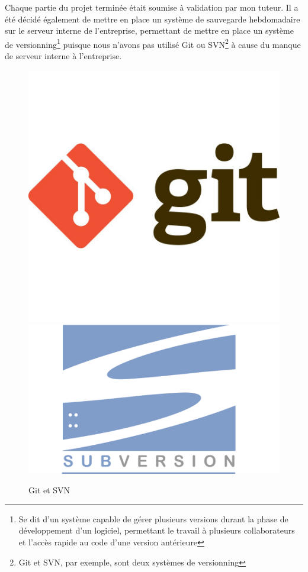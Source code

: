 \documentclass[a4paper]{article}
\begin{document}
    Chaque partie du projet terminée était soumise à validation par mon tuteur. Il a été décidé également de mettre en place un système de sauvegarde hebdomadaire sur le serveur interne de l'entreprise, permettant de mettre en place un système de versionning\footnote{Se dit d'un système capable de gérer plusieurs versions durant la phase de développement d'un logiciel, permettant le travail à plusieurs collaborateurs et l'accès rapide au code d'une version antérieure} puisque nous n'avons pas utilisé Git ou SVN\footnote{Git et SVN, par exemple, sont deux systèmes de versionning} à cause du manque de serveur interne à l'entreprise. \\

    \begin{figure}[H]
        \centering
        \includegraphics[scale=0.5]{img/logo-git}
        \includegraphics[scale=0.15]{img/logo-svn}
        \caption{Git et SVN}
    \end{figure}
\end{document}
